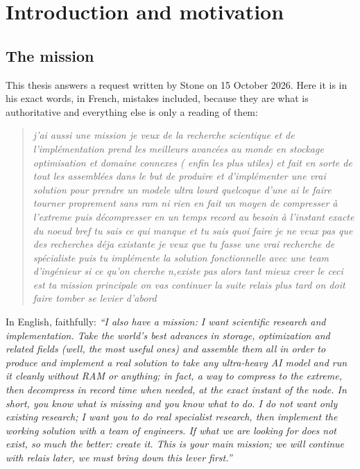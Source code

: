 \chapter{Introduction and motivation}\label{ch:intro}

\section{The mission}\label{sec:mission}

This thesis answers a request written by Stone on 15 October 2026. Here it is in his exact words, in French, mistakes included, because they are what is authoritative and everything else is only a reading of them:

\begin{quote}\itshape{}
j'ai aussi une mission je veux de la recherche scientique et de l'implémentation prend les meilleurs avancées au monde en stockage optimisation et domaine connexes ( enfin les plus utiles) et fait en sorte de tout les assemblées dans le but de produire et d'implémenter une vrai solution pour prendre un modele ultra lourd quelcoque d'une ai le faire tourner proprement sans ram ni rien en fait un moyen de compresser à l'extreme puis décompresser en un temps record au besoin à l'instant exacte du noeud bref tu sais ce qui manque et tu sais quoi faire je ne veux pas que des recherches déja existante je veux que tu fasse une vrai recherche de spécialiste puis tu implémente la solution fonctionnelle avec une team d'ingénieur si ce qu'on cherche n,existe pas alors tant mieux creer le ceci est ta mission principale on vas continuer la suite relais plus tard on doit faire tomber se levier d'abord
\end{quote}

In English, faithfully: \emph{\enquote{I also have a mission: I want scientific research and implementation. Take the world's best advances in storage, optimization and related fields (well, the most useful ones) and assemble them all in order to produce and implement a real solution to take any ultra-heavy AI model and run it cleanly without RAM or anything; in fact, a way to compress to the extreme, then decompress in record time when needed, at the exact instant of the node. In short, you know what is missing and you know what to do. I do not want only existing research; I want you to do real specialist research, then implement the working solution with a team of engineers. If what we are looking for does not exist, so much the better: create it. This is your main mission; we will continue with relais later, we must bring down this lever first.}}

